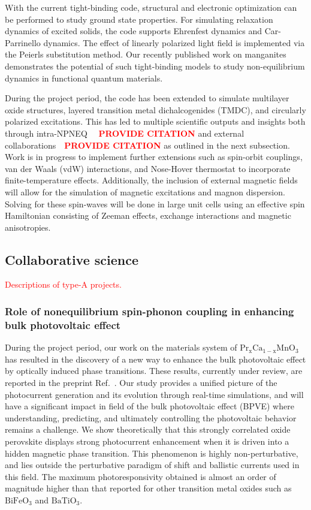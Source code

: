 With the current tight-binding code, structural and electronic optimization can be performed to study ground state properties. 
For simulating relaxation dynamics of excited solids, the code supports Ehrenfest dynamics and Car-Parrinello dynamics. 
The effect of linearly polarized light field is implemented via the Peierls substitution method. 
Our recently published work on manganites~\cite{Sangeeta2020a} demonstrates the potential of such tight-binding models to study non-equilibrium dynamics in functional quantum materials. 

During the project period, the code has been extended to simulate multilayer oxide structures, layered transition metal dichalcogenides (TMDC), and circularly polarized excitations. 
This has led to multiple scientific outputs and insights both through intra-NPNEQ ~\textcolor{red}{~\textbf{PROVIDE CITATION}} and external collaborations~\textcolor{red}{~\textbf{PROVIDE CITATION}} as outlined in the next subsection. 
Work is in progress to implement further extensions such as spin-orbit couplings, van der Waals (vdW) interactions, and Nose-Hover thermostat to incorporate finite-temperature effects. 
Additionally, the inclusion of external magnetic fields will allow for the simulation of magnetic excitations and magnon dispersion. 
Solving for these spin-waves will be done in large unit cells using an effective spin Hamiltonian consisting of Zeeman effects, exchange interactions and magnetic
anisotropies. 

\subsection{Collaborative science}

\textcolor{red}{Descriptions of type-A projects.}

\subsubsection{Role of nonequilibrium spin-phonon coupling in enhancing bulk photovoltaic effect}\label{sec:BPVE}

During the project period, our work on the materials system of \(\mathrm{Pr_xCa_{1-x}MnO_3}\) has resulted in the discovery of a new way to enhance the bulk photovoltaic effect by optically induced phase transitions. 
These results, currently under review, are reported in the preprint Ref.~\cite{Rajpurohit2021}. 
Our study provides a unified picture of the photocurrent generation and its evolution through real-time simulations, and will have a significant impact in field of the bulk photovoltaic effect (BPVE) where understanding, predicting, and ultimately controlling the photovoltaic behavior remains a challenge.
We show theoretically that this strongly correlated oxide perovskite displays strong photocurrent enhancement when it is driven into a hidden magnetic phase transition.
This phenomenon is highly non-perturbative, and lies outside the perturbative paradigm of shift and ballistic currents used in this field. 
The maximum photoresponsivity obtained is almost an order of magnitude higher than that reported for other transition metal oxides such as \(\mathrm{BiFeO_3}\) and \(\mathrm{BaTiO_3}\).

